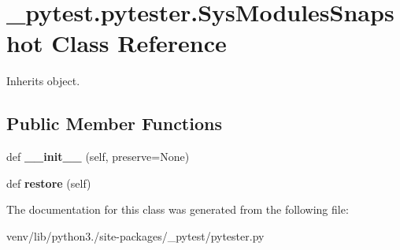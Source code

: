 \hypertarget{class__pytest_1_1pytester_1_1_sys_modules_snapshot}{}\section{\+\_\+pytest.\+pytester.\+Sys\+Modules\+Snapshot Class Reference}
\label{class__pytest_1_1pytester_1_1_sys_modules_snapshot}


Inherits object.

\subsection*{Public Member Functions}
\begin{DoxyCompactItemize}
\item 
\mbox{\label{class__pytest_1_1pytester_1_1_sys_modules_snapshot_a8f92a8449fd0a82c0abd8ad3e0d81206}} 
def {\bfseries \+\_\+\+\_\+init\+\_\+\+\_\+} (self, preserve=None)
\item 
\mbox{\label{class__pytest_1_1pytester_1_1_sys_modules_snapshot_a3ba82915807609ab1d907ed4c4400910}} 
def {\bfseries restore} (self)
\end{DoxyCompactItemize}


The documentation for this class was generated from the following file\+:\begin{DoxyCompactItemize}
\item 
venv/lib/python3./site-\/packages/\+\_\+pytest/pytester.\+py\end{DoxyCompactItemize}

